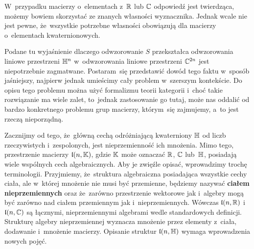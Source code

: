 \documentclass[a4paper,11pt]{article}
\begin{document}
W~przypadku macierzy o~elementach z~$\mathbb{R}$ lub $\mathbb{C}$ odpowiedź jest
twierdząca, możemy bowiem skorzystać ze znanych własności wyznacznika.
Jednak wcale nie jest pewne, że~wszystkie potrzebne własności obowiązują
dla macierzy o~elementach kwaternionowych.

\vspace{\spaceFour}





 Podane tu wyjaśnienie dlaczego odwzorowanie $S$ przekształca
odwzorowania liniowe przestrzeni $\mathbb{H}^{ n }$ w~odwzorowania liniowe
przestrzeni $\mathbb{C}^{ 2n }$ jest niepotrzebnie zagmatwane. Postaram~się
przedstawić dowód tego faktu w~sposób jaśniejszy, najpierw jednak
umieścimy cały problem w~szerszym kontekście. Do opisu tego problemu
można użyć formalizmu teorii kategorii i~choć takie rozwiązanie ma wiele
zalet, to~jednak zastosowanie go tutaj, może nas oddalić od bardzo
konkretnego problemu grup macierzy, którym~się zajmujemy, a~to jest rzeczą
nieporządną.

Zacznijmy od tego, że~główną cechą odróżniającą kwaterniony $\mathbb{H}$ od liczb
rzeczywistych i~zespolonych, jest nieprzemienność ich mnożenia. Mimo tego,
przestrzenie macierzy $\mathfrak{l}( n, \mathbb{K} )$, gdzie $\mathbb{K}$ może oznaczać
$\mathbb{R}$, $\mathbb{C}$ lub~$\mathbb{H}$, posiadają wiele wspólnych cech algebraicznych.
Aby je zwięźle opisać, wprowadzimy trochę terminologii. Przyjmiemy,
że~struktura algebraiczna posiadająca wszystkie cechy ciała, ale w~której
mnożenie nie musi być przemienne, będziemy nazywać \textbf{ciałem
  nieprzemiennych} oraz że~zarówno przestrzenie wektorowe jak i~algebry mogą
być zarówno nad ciałem przemiennym jak i~nieprzemiennych. Wówczas
$\mathfrak{l}( n, \mathbb{R} )$ i~$\mathfrak{l}( n, \mathbb{C} )$ są łącznymi, nieprzemiennymi
algebrami wedle standardowych definicji. Strukturę algebry nieprzemiennej
wyznacza mnożenie przez elementy z~ciała, dodawanie i~mnożenie macierzy.
Opisanie struktur $\mathfrak{l}( n, \mathbb{H} )$ wymaga wprowadzenia nowych pojęć.
\end{document}
